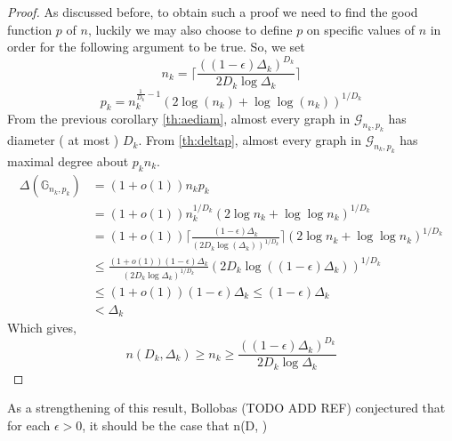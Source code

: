 \begin{proof}
	As discussed before, to obtain such a proof we need to find the good function $p$ of $n$, luckily we may also choose to define $p$ on specific values of $n$ in order for the following argument to be true. 
	So, we set 
	\begin{equation}
		n_k = \lceil \frac{((1-\epsilon)\Delta_k)^{D_k}}{2D_k\log \Delta_k} \rceil
	\end{equation}
	\begin{equation}
		p_k = n_k^{\frac{1}{D_k} -1 }(2\log(n_k) + \log\log(n_k))^{1/D_k}
	\end{equation}
	From the previous corollary \ref{th:aediam}, almost every graph in $\mathcal{G}_{n_k, p_k}$ has diameter ( at most ) $D_k$.
	From \ref{th:deltap}, almost every graph in $\mathcal{G}_{n_k,p_k}$ has maximal degree about $p_kn_k$. 
	\begin{align}
		\Delta(\mathbb{G}_{n_k,p_k}) 	&=(1+o(1))n_kp_k \\
						&= (1+o(1))n_k^{1/D_k}(2\log n_k + \log\log n_k)^{1/D_k}	\\
						&= (1+o(1))\lceil{\frac{(1-\epsilon)\Delta_k}{(2D_k\log(\Delta_k))^{1/D_k}}}\rceil(2\log n_k +  \log\log n_k)^{1/D_k}\\	
						&\leq \frac{(1+o(1))(1-\epsilon) \Delta_k}{(2D_k \log\Delta_k)^{1/D_k}} (2D_k\log((1-\epsilon)\Delta_k))^{1/D_k} \\   
						&\leq (1+o(1))(1-\epsilon)\Delta_k \leq (1-\epsilon)\Delta_k \\
						&< \Delta_k	
	\end{align}	
	Which gives,
	\begin{equation}
		n(D_k, \Delta_k)\geq n_k \geq \frac{((1-\epsilon)\Delta_k)^{D_k}}{2D_k\log \Delta_k} 
	\end{equation}
\end{proof}
As a strengthening of this result, Bollobas (TODO ADD REF) conjectured that for each $\epsilon > 0$, it should be the case that $$n(D, \Delta) 


